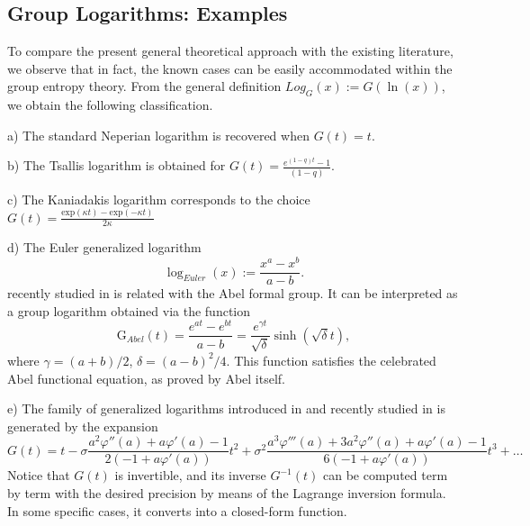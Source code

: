 \documentclass[10pt]{amsart}
\newcommand{\beq}{\begin{equation}}
\newcommand{\eeq}{\end{equation}}
\newcommand{\nn}{\nonumber}
\theoremstyle{definition}
\theoremstyle{definition}	 %
\begin{document}
\subsection{Group Logarithms: Examples}
To compare the present general theoretical approach with the existing literature, we observe that in fact, the known cases can be easily accommodated within the group entropy theory. From the general definition $Log_{G}(x):=G(\ln (x))$, we obtain the following classification.

\vspace{3mm}

a) The standard Neperian logarithm is recovered when $G(t)=t$.

b) The Tsallis logarithm \cite{tsallis1988} is obtained for $G(t)= \frac{e^{(1-q)t}-1}{(1-q)}$.

c) The Kaniadakis logarithm \cite{kaniadakis2002,kaniadakiseditorial2004,kaniadakis2005,
kaniadakis2009,kaniadakis2017} corresponds to the choice
$G(t)= \frac{\text{exp}(\kappa t)-\text{exp}(-\kappa t)}{2 \kappa}$

d) The Euler generalized logarithm
\beq
\log_{Euler}(x):=\frac{x^{a}-x^{b}}{a-b}.
\eeq
recently studied in \cite{Cichocki2025a,Cichocki2025c} is related with the Abel formal group. It can be interpreted as a group logarithm obtained via the function
\beq
\nn
\text{G}_{Abel}(t)=\frac{e^{at}-e^{bt}}{a-b}=\frac{e^{\gamma t}}{\sqrt{\delta}}\sinh \left(\sqrt{\delta} t\right), \label{Abelexp}
\eeq
where
$
\gamma= (a+b)/2$, $\delta=(a-b)^2/4.$
This function satisfies the celebrated Abel functional equation, as proved by Abel itself.



e) The family of generalized logarithms introduced in \cite{tempesta2015} and recently studied in \cite{Cichocki2025b} is generated by the expansion
\beq
\nn G(t)=t-\sigma\frac{a^2 \varphi''(a)+a \varphi'(a)-1}{2(-1+a\varphi'(a))}t^2 +
\sigma^2\frac{a^3 \varphi'''(a)+3 a^2 \varphi''(a)+a \varphi'(a)-1}{6(-1+a\varphi'(a))} t^3+\ldots
\eeq
Notice that $G(t)$ is invertible, and its inverse $G^{-1}(t)$ can be computed term by term with the desired precision by means of the Lagrange inversion formula. In some specific cases, it converts into a closed-form function.
\end{document}
